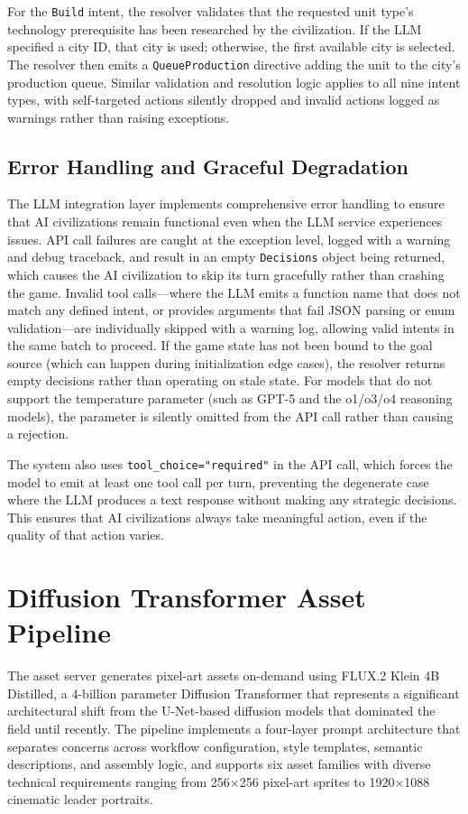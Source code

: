 \documentclass[conference]{IEEEtran}
\begin{document}
For the \texttt{Build} intent, the resolver validates that the requested unit type's technology prerequisite has been researched by the civilization. If the LLM specified a city ID, that city is used; otherwise, the first available city is selected. The resolver then emits a \texttt{QueueProduction} directive adding the unit to the city's production queue. Similar validation and resolution logic applies to all nine intent types, with self-targeted actions silently dropped and invalid actions logged as warnings rather than raising exceptions.

\subsection{Error Handling and Graceful Degradation}

The LLM integration layer implements comprehensive error handling to ensure that AI civilizations remain functional even when the LLM service experiences issues. API call failures are caught at the exception level, logged with a warning and debug traceback, and result in an empty \texttt{Decisions} object being returned, which causes the AI civilization to skip its turn gracefully rather than crashing the game. Invalid tool calls---where the LLM emits a function name that does not match any defined intent, or provides arguments that fail JSON parsing or enum validation---are individually skipped with a warning log, allowing valid intents in the same batch to proceed. If the game state has not been bound to the goal source (which can happen during initialization edge cases), the resolver returns empty decisions rather than operating on stale state. For models that do not support the temperature parameter (such as GPT-5 and the o1/o3/o4 reasoning models), the parameter is silently omitted from the API call rather than causing a rejection.

The system also uses \texttt{tool\_choice="required"} in the API call, which forces the model to emit at least one tool call per turn, preventing the degenerate case where the LLM produces a text response without making any strategic decisions. This ensures that AI civilizations always take meaningful action, even if the quality of that action varies.

\section{Diffusion Transformer Asset Pipeline}
\label{sec:dit}

The asset server generates pixel-art assets on-demand using FLUX.2 Klein 4B Distilled, a 4-billion parameter Diffusion Transformer that represents a significant architectural shift from the U-Net-based diffusion models that dominated the field until recently. The pipeline implements a four-layer prompt architecture that separates concerns across workflow configuration, style templates, semantic descriptions, and assembly logic, and supports six asset families with diverse technical requirements ranging from 256$\times$256 pixel-art sprites to 1920$\times$1088 cinematic leader portraits.
\end{document}
